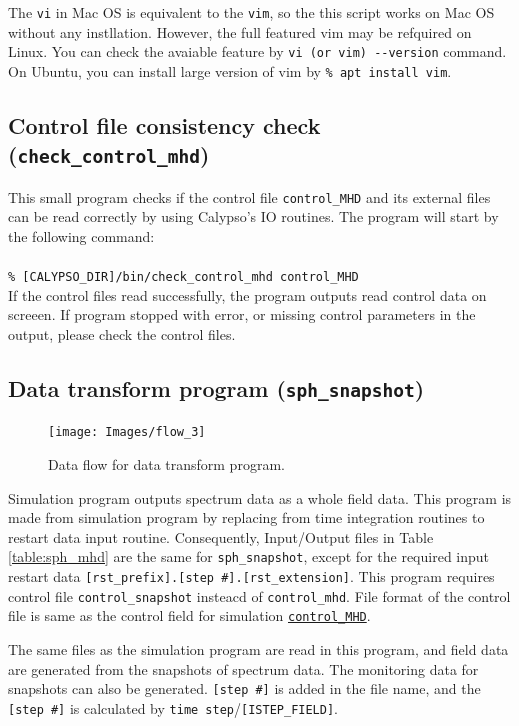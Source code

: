 The \verb|vi| in Mac OS is equivalent to the \verb|vim|, so the this script works on Mac OS without any instllation. However, the full featured vim may be refquired on Linux. You can check the avaiable feature by \verb|vi (or vim) --version| command. On Ubuntu, you can install large version of vim by \verb|% apt install vim|.


\subsection{Control file consistency check ({\tt check\_control\_mhd})}
This small program checks if the control file \verb|control_MHD| and its external files can be read correctly by using Calypso's IO routines. The program will start by the following command:\\
\\
\verb|% [CALYPSO_DIR]/bin/check_control_mhd control_MHD|
\\
If the control files read successfully, the program outputs read control data on screeen. If program stopped with error, or missing control parameters in the output, please check the control files.


\subsection{Data transform program ({\tt sph\_snapshot})}
\label{section:sph_snapshot}
%
\begin{figure}[htbp]
\begin{center}
\texttt{[image: Images/flow\_3]}
\end{center}
\caption{Data flow for data transform program.}
\label{fig:flow_3}
\end{figure}
%
Simulation program outputs spectrum data as a whole field data. This program is made from simulation program by replacing from time integration routines to restart data input routine. Consequently, Input/Output files in Table \ref{table:sph_mhd} are the same for {\tt sph\_snapshot}, except for the required input restart data \verb|[rst_prefix].[step #].[rst_extension]|.
%
This program requires control file \verb|control_snapshot| insteacd of \verb|control_mhd|. File format of the control file is same as the control field for simulation \hyperref[href_i:MHD_control]{\tt control\_MHD}.

The same files as the simulation program are read in this program, and field data are generated from the snapshots of spectrum data. The monitoring data for snapshots can also be generated. \verb|[step #]| is added in the file name, and the \verb|[step #]| is calculated by \verb|time step|/\verb|[ISTEP_FIELD]|.

